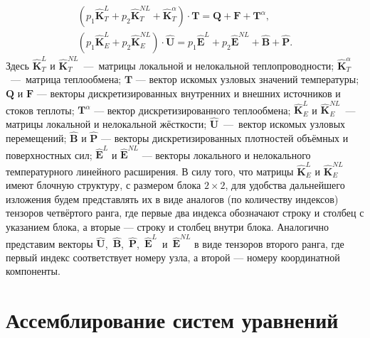 \begin{gather}
	\label{eq:ThermalSLAE}
	\left( p_1 \widehat{\textbf{K}}^L_T + p_2 \widehat{\textbf{K}}^{NL}_T + \widehat{\textbf{K}}^{\alpha}_T \right) \cdot \textbf{T} = \textbf{Q} + \textbf{F} + \textbf{T}^{\alpha}, \\
	\label{eq:StressSLAE}
	\left( p_1 \widehat{\textbf{K}}^L_E + p_2 \widehat{\textbf{K}}^{NL}_E \right) \cdot \widehat{\textbf{U}} = p_1 \widehat{\textbf{E}}^L + p_2 \widehat{\textbf{E}}^{NL} + \widehat{\textbf{B}} + \widehat{\textbf{P}}.
\end{gather}
Здесь $\widehat{\textbf{K}}^L_T$ и $\widehat{\textbf{K}}^{NL}_T$~---~матрицы локальной и нелокальной теплопроводности;
$\widehat{\textbf{K}}^{\alpha}_T$~---~матрица теплообмена;
$\textbf{T}$ --- вектор искомых узловых значений температуры;
$\textbf{Q}$ и $\textbf{F}$ --- векторы дискретизированных внутренних и внешних источников и стоков теплоты;
$\textbf{T}^{\alpha}$ --- вектор дискретизированного теплообмена;
$\widehat{\textbf{K}}^L_E$ и $\widehat{\textbf{K}}^{NL}_E$~--- матрицы локальной и нелокальной жёсткости;
$\widehat{\textbf{U}}$~---~вектор искомых узловых перемещений;
$\widehat{\textbf{B}}$ и $\widehat{\textbf{P}}$ --- векторы дискретизированных плотностей объёмных и поверхностных сил;
$\widehat{\textbf{E}}^L$ и $\widehat{\textbf{E}}^{NL}$ --- векторы локального и нелокального температурного линейного расширения.
В силу того, что матрицы $\widehat{\textbf{K}}^L_E$ и $\widehat{\textbf{K}}^{NL}_E$ имеют блочную структуру, с размером блока $2 \times 2$, для удобства дальнейшего изложения будем представлять их в виде аналогов (по количеству индексов) тензоров четвёртого ранга, где первые два индекса обозначают строку и столбец с указанием блока, а вторые --- строку и столбец внутри блока.
Аналогично представим векторы \mbox{$\widehat{\textbf{U}}$, $\widehat{\textbf{B}}$, $\widehat{\textbf{P}}$, $\widehat{\textbf{E}}^L$ и $\widehat{\textbf{E}}^{NL}$} в виде тензоров второго ранга, где первый индекс соответствует номеру узла, а второй --- номеру координатной компоненты.

\section{Ассемблирование систем уравнений}\label{sec:NumericalMethods/SLAEAssembling}


